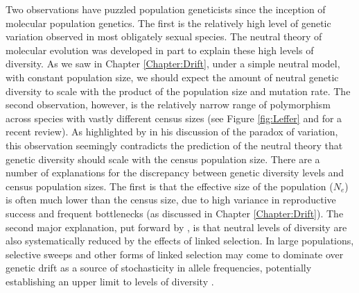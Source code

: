  Two observations have puzzled population geneticists since the
inception of molecular population genetics. The first is the relatively high
level of genetic variation observed in most obligately sexual species.  
The neutral theory of molecular evolution was developed in part to
explain these high levels of diversity. As we saw in Chapter \ref{Chapter:Drift}, 
under a simple neutral model, with constant population size, we should expect the amount of neutral genetic
diversity to scale with the product of the population size and
mutation rate. The second observation, however, is the relatively narrow range 
of polymorphism across species with vastly different census sizes (see
Figure \ref{fig:Leffer} and \citet{leffler:12} for a recent review). 
As highlighted by \citet{Lewontin:74} in his discussion of the paradox
of variation, this observation seemingly contradicts the prediction of the neutral theory that
genetic diversity should scale with the census population size. There are a number of explanations for the discrepancy between genetic
diversity levels and census population sizes. The first is that the effective size of the population ($N_e$) is
often much lower than the census size, due to high variance in
reproductive success and frequent bottlenecks (as discussed in  Chapter \ref{Chapter:Drift}). 
The second major explanation, put forward by \citet{MaynardSmithHaigh74},
is that neutral levels of diversity are also systematically reduced by the effects of linked selection. 
In large populations, selective sweeps and other forms of linked selection may come to dominate over genetic drift as a
source of stochasticity in allele frequencies, potentially establishing an upper limit to levels of diversity \citep{Kaplan:89, Gillespie:00}. 

